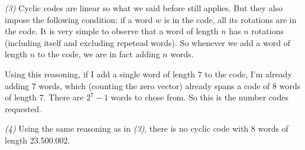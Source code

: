 \documentclass[a4paper, 12pt]{article}
\begin{document}
\textit{(3)} Cyclic codes are linear so what we said before still applies. But they also impose the 
following condition: if a word $w$ is in the code, all its rotations are in the code. It is 
very simple to observe that a word of length $n$ has $n$ rotations (including itself and 
excluding repetead words). So whenever we add a word of length $n$ to the code, we are in 
fact adding $n$ words.

Using this reasoning, if I add a single word of length $7$ to the code, I'm already adding 
$7$ words, which (counting the zero vector) already spans a code of $8$ words of length $7$.
There are $2^7 - 1$ words to chose from. So this is the number codes requested.

\textit{(4)} Using the same reasoning as in \textit{(3)}, there is no cyclic code with $8$
words of length 23.500.002.
\end{document}
